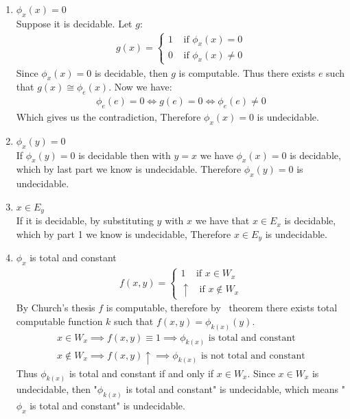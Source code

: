 \begin{enumerate}[label=\arabic*.]
    \item \textbf{$\phi_x(x) = 0$} \\
        Suppose it is decidable. Let $g$:
        \begin{gather*}
            g(x) = \begin{cases}
                1 \ \ \ \ \ \text{if } \phi_x(x) = 0 \\
                0 \ \ \ \ \ \text{if } \phi_x(x) \ne 0
            \end{cases}
        \end{gather*}
        Since $\phi_x(x) = 0$ is decidable, then $g$ is computable. Thus there exists $e$ such that $g(x) \cong \phi_e(x)$. Now we have:
        \begin{gather*}
            \phi_e(e) = 0 \iff g(e) = 0 \iff \phi_e(e) \ne 0
        \end{gather*}
        Which gives us the contradiction, Therefore $\phi_x(x) = 0$ is undecidable.
    
    \item \textbf{$\phi_x(y) = 0$} \\
        If $\phi_x(y) = 0$ is decidable then with $y = x$ we have $\phi_x(x) = 0$ is decidable, which by last part we know is undecidable. Therefore $\phi_x(y) = 0$ is undecidable.
    
    \item \textbf{$x \in E_y$} \\
        If it is decidable, by substituting $y$ with $x$ we have that $x \in E_x$ is decidable, which by part 1 we know is undecidable, Therefore $x \in E_y$ is undecidable.
    
    \item {$\phi_x$ is total and constant}
        \begin{gather*}
            f(x, y) = \begin{cases}
                1 \ \ \ \ \ \text{if } x \in W_x \\
                \uparrow  \ \ \ \ \text{if } x \notin W_x
            \end{cases}
        \end{gather*}
        By Church's thesis $f$ is computable, therefore by \smn\ theorem there exists total computable function $k$ such that $f(x, y) = \phi_{k(x)}(y)$.
        \begin{gather*}
            x \in W_x \implies f(x, y) \equiv 1 \implies \phi_{k(x)} \text{ is total and constant} \\
            x \notin W_x \implies f(x, y) \uparrow \implies \phi_{k(x)} \text{ is not total and constant}
        \end{gather*}
        Thus $\phi_{k(x)}$ is total and constant if and only if $x \in W_x$. Since $x \in W_x$ is undecidable, then "$\phi_{k(x)}$ is total and constant" is undecidable, which means "$\phi_x$ is total and constant" is undecidable.
    

\end{enumerate}
